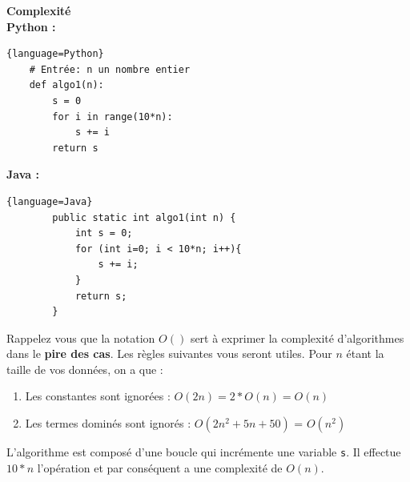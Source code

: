 \begin{Exercice}[10 minutes] \textbf{Complexité} \\
    \textbf{Python :}
    \begin{lstlisting}{language=Python}
    # Entrée: n un nombre entier
    def algo1(n):
        s = 0
        for i in range(10*n):
            s += i
        return s
    \end{lstlisting}
    
    \textbf{Java :}
    \begin{lstlisting}{language=Java}
        public static int algo1(int n) {
            int s = 0;
            for (int i=0; i < 10*n; i++){
                s += i;
            }
            return s;
        }
    \end{lstlisting}
    
    \begin{conseil}
    Rappelez vous que la notation $O()$ sert à exprimer la complexité d'algorithmes dans le \textbf{pire des cas}. Les règles suivantes vous seront utiles. Pour $n$ étant la taille de vos données, on a que :
    \begin{enumerate}
        \item Les constantes sont ignorées : $O(2n) = 2*O(n) = O(n)$ 
        \item Les termes dominés sont ignorés : $O(2n^2+5n+50)$ = $O(n^2)$
    \end{enumerate}
    \end{conseil}
    \begin{solution}
        L'algorithme est composé d'une boucle qui incrémente une variable \lstinline{s}. Il effectue $10*n$ l'opération et par conséquent a une complexité de $O(n)$.
    \end{solution}
\end{Exercice}

